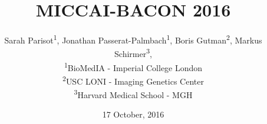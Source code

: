 \usepackage[utf8]{inputenc}
\usepackage[T1]{fontenc}
\usepackage{mathptmx}
\usepackage[super]{nth}
\usepackage{authblk}

\renewcommand{\procpdfauthor}{Sarah Parisot\textsuperscript{1}, Jonathan Passerat-Palmbach\textsuperscript{1}, Boris Gutman\textsuperscript{2}, Markus Schirmer\textsuperscript{3}, \\ \textsuperscript{1}BioMedIA - Imperial College London\\ \textsuperscript{2}USC LONI - Imaging Genetics Center\\ \textsuperscript{3}Harvard Medical School - MGH}

\renewcommand{\procpdftitle}{{MICCAI-BACON 2016}}
\renewcommand{\procpdfsubject}{{Workshop on Brain Analysis using COnnectivity Networks}}

\renewcommand{\procchead}{} 
\renewcommand{\proclhead}{}
\renewcommand{\proccfoot}{\thepage}

\author{\procpdfauthor}
\title{\procpdftitle}
\date{17 October, 2016}